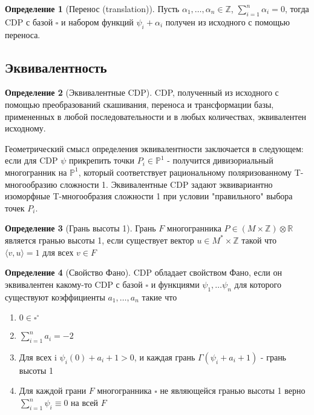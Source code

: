\documentclass[fontsize=14pt]{scrartcl}
\theoremstyle{definition}
\newtheorem{definition}{Определение}[section]
\begin{document}
\begin{definition}[Перенос (translation)]
Пусть $\alpha_1, \dots, \alpha_n \in \mathds{Z}
$, $\sum_{i=1}^n \alpha_i = 0$, тогда CDP с базой $\square$ и набором функций $\psi_i + \alpha_i$ получен из исходного с помощью переноса.
\end{definition}

\subsection{Эквивалентность}
\begin{definition}[Эквивалентные CDP]
CDP, полученный из исходного с помощью преобразований скашивания, переноса и трансформации базы, примененных в любой последовательности и в любых количествах, эквивалентен исходному.
\end{definition}
Геометрический смысл определения эквивалентности заключается в следующем: если для CDP $\psi$ прикрепить точки $P_i \in \mathds{P}^1$ - получится дивизориальный многогранник на $\mathds{P}^1$, который соответствует рациональному поляризованному T-многообразию сложности 1. Эквивалентные CDP задают эквивариантно изоморфные T-многообразия сложности 1 при условии "правильного" выбора точек $P_i$.

\begin{definition}[Грань высоты 1]
	Грань $F$ многогранника $P \in (M \times \mathds{Z}) \otimes \mathds{R}$ является гранью высоты 1, если существует вектор $u \in M^* \times \mathds{Z}$ такой что $\langle v, u\rangle = 1$ для всех $v \in F$
\end{definition}

\begin{definition}[Свойство Фано]
CDP обладает свойством Фано, если он эквивалентен какому-то CDP с базой $\square$ и функциями $\psi_1, \dots \psi_n$ для которого существуют коэффициенты $a_1, \dots, a_n$ такие что 
\begin{enumerate}
	\item $0 \in \square^{\circ}$
	\item $\sum_{i=1}^n a_i = -2$
	\item Для всех i $\psi_i(0) + a_i + 1 > 0$, и каждая грань $\Gamma(\psi_i + a_i + 1)$ - грань высоты 1
	\item Для каждой грани $F$ многогранника $\square$ не являющейся гранью высоты 1 верно $\sum_{i=1}^n \psi_i \equiv 0$ на всей $F$
\end{enumerate}
\end{definition}
\end{document}
